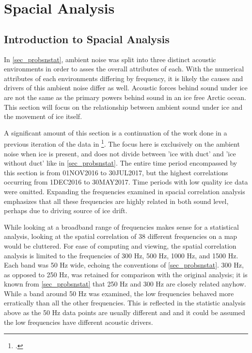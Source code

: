 
\chapter{Spacial Analysis} \label{chap_spacial}

\section{Introduction to Spacial Analysis} \label{sec_intro_spac}

In \autoref{sec_probsnstat}, ambient noise was split into three distinct acoustic environments in order to asses the overall attributes of each. With the numerical attributes of each environments differing by frequency, it is likely the causes and drivers of this ambient noise differ as well. Acoustic forces behind sound under ice are not the same as the primary powers behind sound in an ice free Arctic ocean. This section will focus on the relationship between ambient sound under ice and the movement of ice itself.

A significant amount of this section is a continuation of the work done in a previous iteration of the data in \footcite[]{BonnelMain}. The focus here is exclusively on the ambient noise when ice is present, and does not divide between 'ice with duct' and 'ice without duct' like in \autoref{sec_probsnstat}. The entire time period encompassed by this section is from 01NOV2016 to 30JUL2017, but the highest correlations occurring from 1DEC2016 to 30MAY2017. Time periods with low quality ice data were omitted. Expanding the frequencies examined in spacial correlation analysis emphasizes that all these frequencies are highly related in both sound level, perhaps due to driving source of ice drift. %

While looking at a broadband range of frequencies makes sense for a statistical analysis, looking at the spatial correlation of 38 different frequencies on a map would be cluttered. For ease of computing and viewing, the spatial correlation analysis is limited to the frequencies of 300 Hz, 500 Hz, 1000 Hz, and 1500 Hz. Each band was 50 Hz wide, echoing the conventions of \autoref{sec_probsnstat}. 300 Hz, as opposed to 250 Hz, was retained for comparison with the original analysis; it is known from \autoref{sec_probsnstat} that 250 Hz and 300 Hz are closely related anyhow. While a band around 50 Hz was examined, the low frequencies behaved more erratically than all the other frequencies. This is reflected in the statistic analysis above as the 50 Hz data points are usually different and and it could be assumed the low frequencies have different acoustic drivers. 

